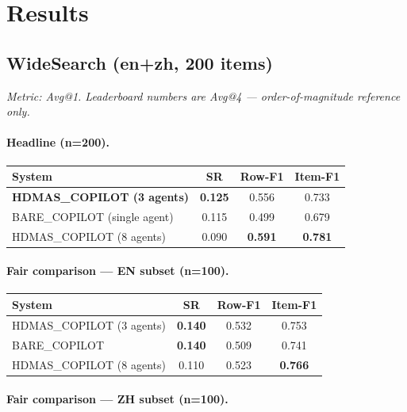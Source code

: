 \documentclass[11pt]{article}
\begin{document}
\section{Results}

\subsection{WideSearch (en+zh, 200 items)}

\noindent\emph{Metric: Avg@1. Leaderboard numbers are Avg@4 --- order-of-magnitude reference only.}

\paragraph{Headline (n=200).}

\begin{center}
\begin{tabular}{lccc}
\toprule
System & SR & Row-F1 & Item-F1 \\
\midrule
\textbf{HDMAS\_COPILOT (3 agents)} & \textbf{0.125} & 0.556 & 0.733 \\
BARE\_COPILOT (single agent)       & 0.115 & 0.499 & 0.679 \\
HDMAS\_COPILOT (8 agents)          & 0.090 & \textbf{0.591} & \textbf{0.781} \\
\bottomrule
\end{tabular}
\end{center}

\paragraph{Fair comparison --- EN subset (n=100).}

\begin{center}
\begin{tabular}{lccc}
\toprule
System & SR & Row-F1 & Item-F1 \\
\midrule
HDMAS\_COPILOT (3 agents) & \textbf{0.140} & 0.532          & 0.753 \\
BARE\_COPILOT             & \textbf{0.140} & 0.509          & 0.741 \\
HDMAS\_COPILOT (8 agents) & 0.110          & 0.523          & \textbf{0.766} \\
\bottomrule
\end{tabular}
\end{center}

\paragraph{Fair comparison --- ZH subset (n=100).}
\end{document}
